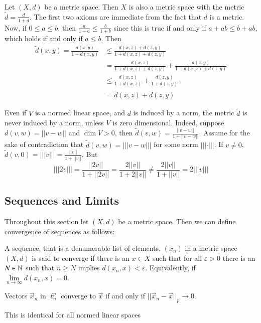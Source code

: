 \begin{eg}
    Let $(X,d)$ be a metric space. Then $X$ is also a metric space with the metric $\tilde{d} = \frac{d}{1+d}$. The first two axioms are immediate from the fact that $d$ is a metric. Now, if $0 \leq a \leq b$, then $\frac{a}{1+a} \leq \frac{b}{1+b}$ since this is true if and only if $a+ab \leq b + ab$, which holds if and only if $a \leq b$. Then \begin{align*}
        \tilde{d}(x,y) = \frac{d(x,y)}{1+d(x,y)} &\leq \frac{d(x,z) + d(z,y)}{1+d(x,z)+d(z,y)} \\
        &= \frac{d(x,z)}{1+d(x,z)+d(z,y)} + \frac{d(z,y)}{1+d(x,z)+d(z,y)} \\
        &\leq \frac{d(x,z)}{1+d(x,z)} + \frac{d(z,y)}{1+d(z,y)} \\
        &= \tilde{d}(x,z) + \tilde{d}(z,y)
    \end{align*}
\end{eg}

Even if $V$ is a normed linear space, and $d$ is induced by a norm, the metric $\tilde{d}$ is never induced by a norm, unless $V$ is zero dimensional. Indeed, suppose $d(v,w) = ||v-w||$ and $\dim V > 0$, then $\tilde{d}(v,w) = \frac{||v-w||}{1+||v-w||}$. Assume for the sake of contradiction that $\tilde{d}(v,w) = |||v-w|||$ for some norm $|||\cdot |||$. If $v \neq 0$, $\tilde{d}(v,0) = |||v||| = \frac{||v||}{1+||v||}$. But $$|||2v||| = \frac{||2v||}{1+||2v||} = \frac{2||v||}{1+2||v||} \neq \frac{2||v||}{1+||v||} = 2|||v|||$$


\subsection{Sequences and Limits}

Throughout this section let $(X,d)$ be a metric space. Then we can define convergence of sequences as follows: 

\begin{defn}
    A sequence, that is a denumerable list of elements, $(x_n)$ in a metric space $(X,d)$ is said to converge if there is an $x \in X$ such that for all $\varepsilon > 0$ there is an $N \in \mathbb N$ such that $n \geq N$ implies $d(x_n,x) < \varepsilon$. Equivalently, if $\lim\limits_{n\rightarrow \infty}d(x_n,x) = 0$.
\end{defn}

\begin{eg}
    Vectors $\vec{x}_n$ in $\ell_n^p$ converge to $\vec{x}$ if and only if $||\vec{x}_n - \vec{x}||_p\rightarrow 0$.
\end{eg}
This is identical for all normed linear spaces

